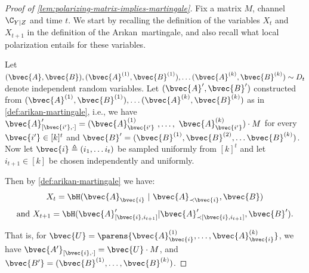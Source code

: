 \documentclass[11pt]{article}
\newcommand{\Arikan}{Ar\i kan}
\begin{document}
\begin{proof}[Proof of \cref{lem:polarizing-matrix-implies-martingale}]
	Fix a matrix $M$, channel $\C_{Y|Z}$ and time $t$. 
	We start by recalling the definition of the variables $X_t$ and $X_{t+1}$ in the definition of the \Arikan\ martingale, and also recall what local polarization entails for these variables.
	
	Let $(\bvec{A}, \bvec{B}), (\bvec{A}^{(1)}, \bvec{B}^{(1)}), \ldots (\bvec{A}^{(k)}, \bvec{B}^{(k)}) \sim D_t$ denote independent random variables. Let $(\bvec{A}', \bvec{B}')$ constructed from $(\bvec{A}^{(1)}, \bvec{B}^{(1)}), \ldots (\bvec{A}^{(k)}, \bvec{B}^{(k)})$ as in \cref{def:arikan-martingale}, i.e., we have
	$\bvec{A}'_{[\bvec{i'}, \cdot]}
	= (\bvec{A}^{(1)}_{\bvec{i'} } ~ ,\dots, ~ \bvec{A}^{(k)}_{\bvec{i'}})\cdot  M$ for every $\bvec{i'} \in [k]^t$
	and $\bvec{B}' = (\bvec{B}^{(1)}, \bvec{B}^{(2)}, \ldots \bvec{B}^{(k)})$.
	Now 
	let $\bvec{i} \triangleq (i_1, \ldots i_t)$ be sampled uniformly from $[k]^t$ and let $i_{t+1} \in [k]$ be chosen independently and uniformly.
	
	Then by \cref{def:arikan-martingale} we have: 
	\[X_t = \bH(\bvec{A}_{\bvec{i}} ~|~ \bvec{A}_{\prec \bvec{i}}, \bvec{B})\]
	\[\mbox{and~} X_{t+1} = \bH(\bvec{A}'_{[\bvec{i}, i_{t+1}]} | \bvec{A}'_{\prec [\bvec{i}, i_{t+1}]}, \bvec{B}').\]
	
	That is, for $\bvec{U}=\parens{\bvec{A}_{\bvec{i}}^{(1)},\dots,\bvec{A}_{\bvec{i}}^{(k)}}$, we have $\bvec{A'}_{[\bvec{i}, \cdot]} = \bvec{U} \cdot M$, and $\bvec{B'} = (\bvec{B}^{(1)}, \ldots, \bvec{B}^{(k)})$.  
	

\end{proof}
\end{document}
